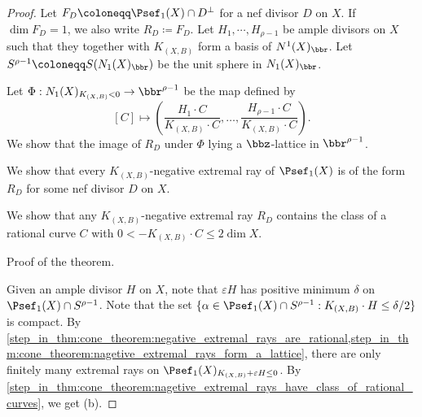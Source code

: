    \begin{proof}
        Let \(F_D \coloneqq \Psef_1(X) \cap D^\perp\) for a nef divisor \(D\) on \(X\).
        If \(\dim F_D = 1\), we also write \(R_D \coloneqq F_D\).
        Let \(H_1,\cdots,H_{\rho-1}\) be ample divisors on \(X\) such that they together with \(K_{(X,B)}\) form a basis of \(N^1(X)_\bbr\).
        Let \(S^{\rho-1} \coloneqq S(N_1(X)_\bbr)\) be the unit sphere in \(N_1(X)_\bbr\).
        
        \begin{step}\label{step_in_thm:cone_theorem:nagetive_extremal_rays_form_a_lattice}
            Let \(\Phi: N_1(X)_{K_{(X,B)}<0} \to \bbr^{\rho-1}\) be the map defined by 
            \[ [C] \mapsto \left( \frac{H_1 \cdot C}{K_{(X,B)}\cdot C},\ldots, \frac{H_{\rho-1} \cdot C}{K_{(X,B)}\cdot C}\right). \]
            We show that the image of \(R_D\) under \(\Phi\) lying a \(\bbz\)-lattice in \(\bbr^{\rho-1}\).
        \end{step}

        \begin{step}\label{step_in_thm:cone_theorem:negative_extremal_rays_are_rational}
            We show that every \(K_{(X,B)}\)-negative extremal ray of \(\Psef_1(X)\) is of the form \(R_D\) for some nef divisor \(D\) on \(X\).
        \end{step}

        \begin{step}\label{step_in_thm:cone_theorem:nagetive_extremal_rays_have_class_of_rational_curves}
            We show that any \(K_{(X,B)}\)-negative extremal ray \(R_D\) contains the class of a rational curve \(C\) with \(0 < -K_{(X,B)} \cdot C \leq 2 \dim X\).
        \end{step}


        \begin{step}\label{step_in_thm:cone_theorem:finish_the_proof}
            Proof of the theorem.
        \end{step}
        Given an ample divisor \(H\) on \(X\), note that \(\varepsilon H\) has positive minimum \(\delta\) on \(\Psef_1(X) \cap S^{\rho-1}\).
        Note that the set \(\{\alpha \in \Psef_1(X)\cap S^{\rho-1} : K_{(X,B)}\cdot H \leq \delta/2\}\) is compact.
        By \cref{step_in_thm:cone_theorem:negative_extremal_rays_are_rational,step_in_thm:cone_theorem:nagetive_extremal_rays_form_a_lattice}, 
        there are only finitely many extremal rays on \(\Psef_1(X)_{K_{(X,B)}+\varepsilon H \leq 0}\).
        By \cref{step_in_thm:cone_theorem:nagetive_extremal_rays_have_class_of_rational_curves}, we get (b).


\end{proof}

